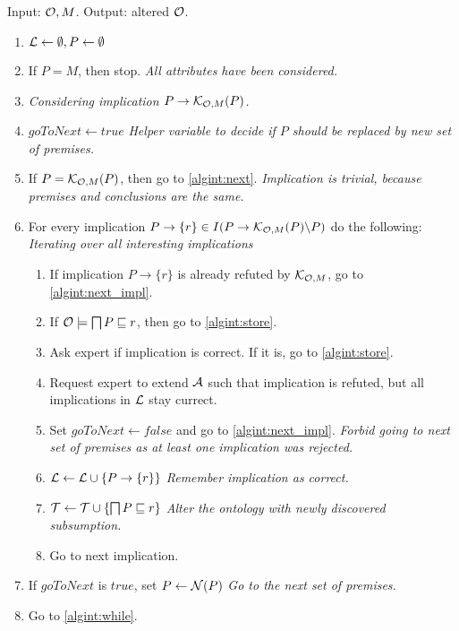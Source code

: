\documentclass{llncs}
\newcommand{\pc}{\ensuremath\mathcal{K}}
\newcommand{\soi}{\ensuremath\mathcal{L}}
\newcommand{\next}{\ensuremath\mathcal{N}}
\newcommand{\ont}{\ensuremath\mathcal{O}}
\newcommand{\tbox}{\ensuremath\mathcal{T}}
\newcommand{\abox}{\ensuremath\mathcal{A}}
\newcommand{\comment}[1]{\emph{#1}}
\begin{document}

\begin{definition}
Input: $\ont, M$. Output: altered $\ont$.
\begin{enumerate}
\item $\soi\leftarrow \emptyset, P\leftarrow \emptyset$
\item\label{algint:while} If $P=M$, then stop. \comment{All attributes have been considered.}
\item \comment{Considering implication $P\to\pc_{\ont,M}(P)$.}
\item $goToNext\leftarrow true$ \comment{Helper variable to decide if $P$ should be replaced by new set of premises.}
\item If $P=\pc_{\ont,M}(P)$, then go to \ref{algint:next}. \comment{Implication is trivial, because premises and conclusions are the same.}
\item For every implication $P\to \{r\} \in I(P\to\pc_{\ont,M}(P)\backslash P)$ do the following: \comment{Iterating over all interesting implications}
\begin{enumerate}
\item If implication $P\to \{r\}$ is already refuted by $\pc_{\ont,M}$, go to \ref{algint:next_impl}.
\item If $\ont\models \bigsqcap P \sqsubseteq r$, then go to \ref{algint:store}.
\item Ask expert if implication is correct. If it is, go to \ref{algint:store}.
\item Request expert to extend $\abox$ such that implication is refuted, but all implications in $\soi$ stay currect.
\item Set $goToNext\leftarrow false$ and go to \ref{algint:next_impl}. \comment{Forbid going to next set of premises as at least one implication was rejected.}
\item \label{algint:store} $\soi\leftarrow \soi\cup \{P\to\{r\}\}$ \comment{Remember implication as correct.}
\item $\tbox\leftarrow\tbox\cup\{\bigsqcap P \sqsubseteq r\}$ \comment{Alter the ontology with newly discovered subsumption.}
\item \label{algint:next_impl} Go to next implication.
\end{enumerate}
\item \label{algint:next} If $goToNext$ is $true$, set $P\leftarrow \next(P)$ \comment{Go to the next set of premises.}
\item Go to \ref{algint:while}.
\end{enumerate}
\end{definition}
\end{document}
